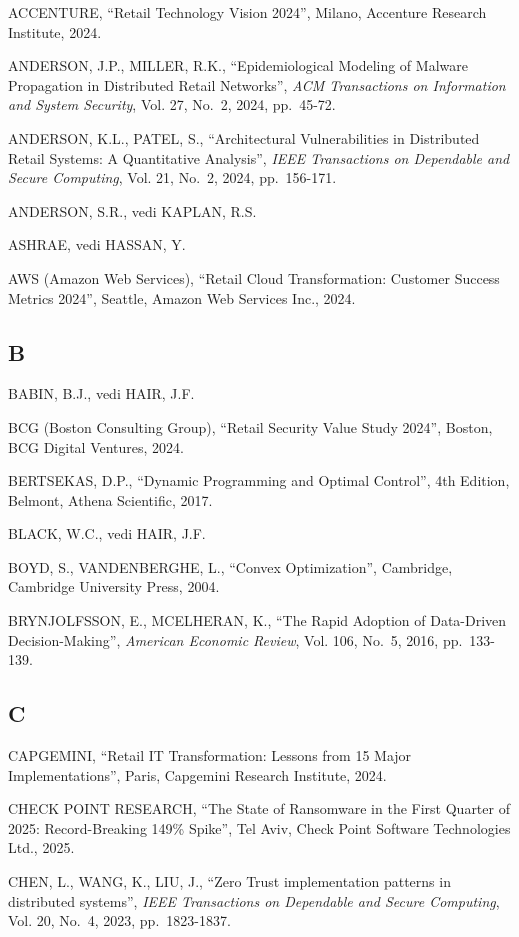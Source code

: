 \documentclass{report}
\begin{document}
ACCENTURE, ``Retail Technology Vision 2024'', Milano, Accenture Research
Institute, 2024.

ANDERSON, J.P., MILLER, R.K., ``Epidemiological Modeling of Malware
Propagation in Distributed Retail Networks'', \emph{ACM Transactions on
Information and System Security}, Vol. 27, No.~2, 2024, pp.~45-72.

ANDERSON, K.L., PATEL, S., ``Architectural Vulnerabilities in
Distributed Retail Systems: A Quantitative Analysis'', \emph{IEEE
Transactions on Dependable and Secure Computing}, Vol. 21, No.~2, 2024,
pp.~156-171.

ANDERSON, S.R., vedi KAPLAN, R.S.

ASHRAE, vedi HASSAN, Y.

AWS (Amazon Web Services), ``Retail Cloud Transformation: Customer
Success Metrics 2024'', Seattle, Amazon Web Services Inc., 2024.

\subsection{B}\label{b-1}

BABIN, B.J., vedi HAIR, J.F.

BCG (Boston Consulting Group), ``Retail Security Value Study 2024'',
Boston, BCG Digital Ventures, 2024.

BERTSEKAS, D.P., ``Dynamic Programming and Optimal Control'', 4th
Edition, Belmont, Athena Scientific, 2017.

BLACK, W.C., vedi HAIR, J.F.

BOYD, S., VANDENBERGHE, L., ``Convex Optimization'', Cambridge,
Cambridge University Press, 2004.

BRYNJOLFSSON, E., MCELHERAN, K., ``The Rapid Adoption of Data-Driven
Decision-Making'', \emph{American Economic Review}, Vol. 106, No.~5,
2016, pp.~133-139.

\subsection{C}\label{c-1}

CAPGEMINI, ``Retail IT Transformation: Lessons from 15 Major
Implementations'', Paris, Capgemini Research Institute, 2024.

CHECK POINT RESEARCH, ``The State of Ransomware in the First Quarter of
2025: Record-Breaking 149\% Spike'', Tel Aviv, Check Point Software
Technologies Ltd., 2025.

CHEN, L., WANG, K., LIU, J., ``Zero Trust implementation patterns in
distributed systems'', \emph{IEEE Transactions on Dependable and Secure
Computing}, Vol. 20, No.~4, 2023, pp.~1823-1837.
\end{document}
